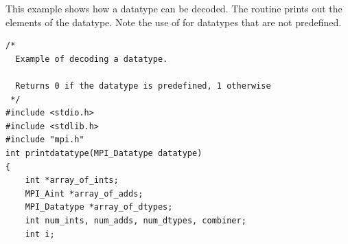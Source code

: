 \begin{example}
%
This
example shows how a datatype can be decoded.  The routine
\gb{} prints out the elements of the datatype.  Note the use
of  for datatypes that are not predefined.
\begin{lstlisting}[language={[MPI]C}]
/*
  Example of decoding a datatype.

  Returns 0 if the datatype is predefined, 1 otherwise
 */
#include <stdio.h>
#include <stdlib.h>
#include "mpi.h"
int printdatatype(MPI_Datatype datatype)
{
    int *array_of_ints;
    MPI_Aint *array_of_adds;
    MPI_Datatype *array_of_dtypes;
    int num_ints, num_adds, num_dtypes, combiner;
    int i;


\end{lstlisting}
\end{example}
